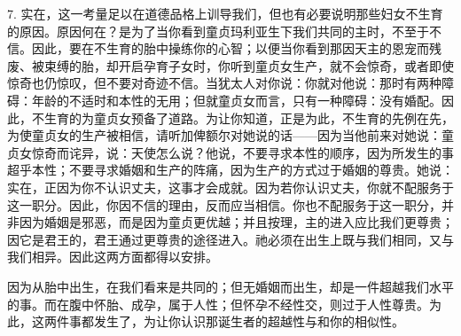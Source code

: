 7. 实在，这一考量足以在道德品格上训导我们，但也有必要说明那些妇女不生育的原因。原因何在？是为了当你看到童贞玛利亚生下我们共同的主时，不至于不信。因此，要在不生育的胎中操练你的心智；以便当你看到那因天主的恩宠而残废、被束缚的胎，却开启孕育子女时，你听到童贞女生产，就不会惊奇，或者即使惊奇也仍惊叹，但不要对奇迹不信。当犹太人对你说：你就对他说：那时有两种障碍：年龄的不适时和本性的无用；但就童贞女而言，只有一种障碍：没有婚配。因此，不生育的为童贞女预备了道路。为让你知道，正是为此，不生育的先例在先，为使童贞女的生产被相信，请听加俾额尔对她说的话——因为当他前来对她说：童贞女惊奇而诧异，说：天使怎么说？他说，不要寻求本性的顺序，因为所发生的事超乎本性；不要寻求婚姻和生产的阵痛，因为生产的方式过于婚姻的尊贵。她说：实在，正因为你不认识丈夫，这事才会成就。因为若你认识丈夫，你就不配服务于这一职分。因此，你因不信的理由，反而应当相信。你也不配服务于这一职分，并非因为婚姻是邪恶，而是因为童贞更优越；并且按理，主的进入应比我们更尊贵；因它是君王的，君王通过更尊贵的途径进入。祂必须在出生上既与我们相同，又与我们相异。因此这两方面都得以安排。\par

因为从胎中出生，在我们看来是共同的；但无婚姻而出生，却是一件超越我们水平的事。而在腹中怀胎、成孕，属于人性；但怀孕不经性交，则过于人性尊贵。为此，这两件事都发生了，为让你认识那诞生者的超越性与和你的相似性。\par

